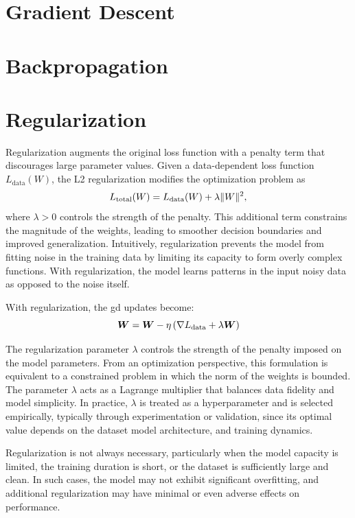 \section{Gradient Descent}


\section{Backpropagation}


\section{Regularization}

Regularization augments the original loss function with a penalty term that discourages large parameter values. Given a data-dependent loss function $L_{\mathrm{data}}(W)$, the L2 regularization modifies the optimization problem as
\[
    L_{\mathrm{total}}(W) = L_{\mathrm{data}}(W) + \lambda \lVert W\rVert^2,
\]
where $\lambda > 0$ controls the strength of the penalty. This additional term constrains the magnitude of the weights, leading to smoother decision boundaries and improved generalization. Intuitively, regularization prevents the model from fitting noise in the training data by limiting its capacity to form overly complex functions. With regularization, the model learns patterns in the input noisy data as opposed to the noise itself.

With regularization, the \gls{gd} updates become:
\[
    \bm{W} = \bm{W} - \eta \left(\nabla L_{\mathrm{data}} + \lambda \bm{W}\right)
\]

The regularization parameter $\lambda$ controls the strength of the penalty imposed on the model parameters. From an optimization perspective, this formulation is equivalent to a constrained problem in which the norm of the weights is bounded. The parameter $\lambda$ acts as a Lagrange multiplier that balances data fidelity and model simplicity. In practice, $\lambda$ is treated as a hyperparameter and is selected empirically, typically through experimentation or validation, since its optimal value depends on the dataset model architecture, and training dynamics.

Regularization is not always necessary, particularly when the model capacity is limited,
the training duration is short, or the dataset is sufficiently large and clean. In such cases,
the model may not exhibit significant overfitting, and additional regularization may have
minimal or even adverse effects on performance.